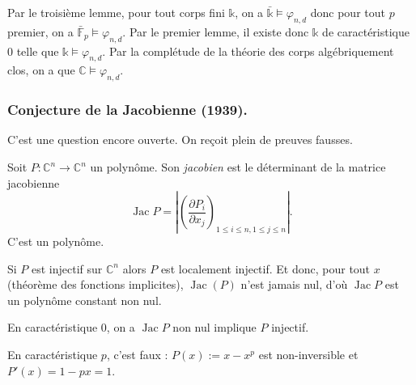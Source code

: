 \documentclass[./main]{subfiles}
\begin{document}
  Par le troisième lemme, pour tout corps fini $\mathds{k}$, on a $\bar{\mathds{k}} \models \varphi_{n,d}$ donc pour tout $p$ premier, on a $\bar{\mathds{F}}_p \models \varphi_{n,d}$.
  Par le premier lemme, il existe donc $\mathds{k}$ de caractéristique $0$ telle que $\mathds{k} \models \varphi_{n,d}$.
  Par la complétude de la théorie des corps algébriquement clos, on a que $\mathds{C} \models \varphi_{n,d}$.

  \subsubsection{Conjecture de la Jacobienne (1939).}

  C'est une question encore ouverte.
  On reçoit plein de preuves fausses.

  \begin{defn}
    Soit $P : \mathds{C}^n \to \mathds{C}^n$ un polynôme.
    Son \textit{jacobien} est le déterminant de la matrice jacobienne \[
      \operatorname{Jac} P = \left| \left(\frac{\partial P_i}{\partial x_j}\right)_{1 \le i \le n, 1 \le j \le n} \right|
    .\]
    C'est un polynôme.
  \end{defn}

  \begin{prop}
    Si $P$ est injectif sur $\mathds{C}^n$ alors $P$ est localement injectif.
    Et donc, pour tout $x$ (théorème des fonctions implicites), $\operatorname{Jac}(P)$ n'est jamais nul, d'où $\operatorname{Jac} P$ est un polynôme constant non nul.
  \end{prop}

  \begin{rmk}
    En caractéristique $0$, on a $\operatorname{Jac} P$ non nul implique  $P$ injectif.
  \end{rmk}

  \begin{rmk}
    En caractéristique $p$, c'est faux : $P(x) := x - x^p$ est non-inversible et  $P'(x) = 1 - px = 1$.
  \end{rmk}
\end{document}
